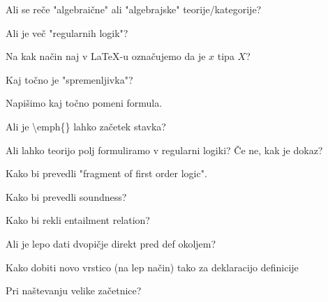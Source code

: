 \documentclass[12pt,a4paper]{article}
\newcommand\ans{\item[\textbf{A:}]}
\begin{document}
    \begin{vprasanja}
        \item Ali se reče "algebraične" ali "algebrajske" teorije/kategorije?
        \ans
        \item  Ali je več "regularnih logik"?
        \ans
        \item  Na kak način naj v \LaTeX -u označujemo da je $x$ tipa $X$?
        \ans
        \item  Kaj točno je "spremenljivka"?
        \ans
        \item  Napišimo kaj točno pomeni formula.
        \ans
        \item  Ali je \textbackslash emph\{\textasteriskcentered \} lahko začetek stavka?
        \ans
        \item  Ali lahko teorijo polj formuliramo v regularni logiki? Če ne, kak je dokaz?
        \ans
        \item  Kako bi prevedli "fragment of first order logic".
        \ans
        \item  Kako bi prevedli soundness?
        \ans
        \item  Kako bi rekli entailment relation?
        \ans
        \item Ali je lepo dati dvopičje direkt pred def okoljem?
        \ans
        \item Kako dobiti novo vrstico (na lep način) tako za deklaracijo definicije
        \ans 
        \item Pri naštevanju velike začetnice?
        \ans
    \end{vprasanja}
\end{document}
